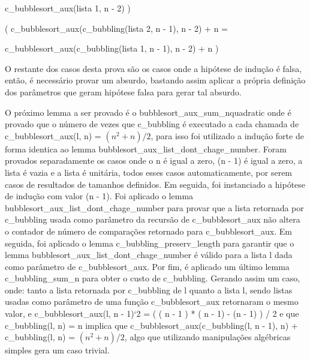 \documentclass[12pt]{article}
\begin{document}
c\_bubblesort\_aux(lista 1, n - 2) ) \implies 


( c\_bubblesort\_aux(c\_bubbling(lista 2, n - 1), n - 2) + n =

c\_bubblesort\_aux(c\_bubbling(lista 1, n - 1), n - 2)  + n )
\newline

O restante dos casos desta prova são os casos onde a hipótese de indução é falsa, então, é necessário provar um absurdo, bastando assim aplicar a própria definição dos parâmetros que geram hipótese falsa para gerar tal absurdo. 

O próximo lemma a ser provado é o bubblesort\_aux\_sum\_nquadratic onde é provado que o número de vezes que c\_bubbling é executado a cada chamada de c\_bubblesort\_aux(l, n) = $(n^{2} + n)/2$, para isso foi utilizado a indução forte de forma identica ao lemma bubblesort\_aux\_list\_dont\_chage\_number. Foram provados separadamente os casos onde o n é igual a zero, (n - 1) é igual a zero, a lista é vazia e a lista é unitária, todos esses casos automaticamente, por serem casos de resultados de tamanhos definidos. Em seguida, foi instanciado a hipótese de indução com valor (n - 1). Foi aplicado o lemma bubblesort\_aux\_list\_dont\_chage\_number para provar que a lista retornada por c\_bubbling usada como parâmetro da recursão de c\_bubblesort\_aux não altera o contador de número de comparações retornado para c\_bubblesort\_aux. Em seguida, foi aplicado o lemma c\_bubbling\_preserv\_length para garantir que o lemma bubblesort\_aux\_list\_dont\_chage\_number é válido para a lista l dada como parâmetro de c\_bubblesort\_aux. Por fim, é aplicado um último lemma c\_bubbling\_sum\_n para obter o custo de c\_bubbling. Gerando assim um caso, onde: tanto a lista retornada por c\_bubbling de l quanto a lista l, sendo listas usadas como parâmetro de uma função c\_bubblesort\_aux retornaram o mesmo valor, e c\_bubblesort\_aux(l, n - 1)`2 = ( ( n - 1 ) * ( n - 1) - (n - 1) ) / 2 e que c\_bubbling(l, n) = n implica que c\_bubblesort\_aux(c\_bubbling(l, n - 1), n) + c\_bubbling(l, n) = $(n^{2} + n)/2$, algo que utilizando manipulações algébricas simples gera um caso trivial. 
\end{document}

